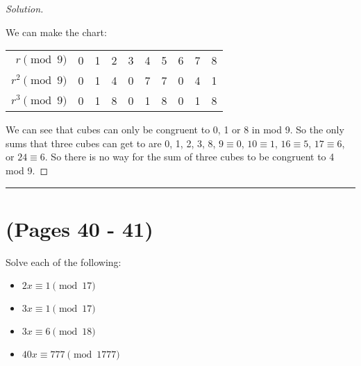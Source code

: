 \documentclass[11pt]{article}
\newcommand{\bline}{\noindent\rule[0.5ex]{\linewidth}{1pt}}
\newenvironment{problem}[2][Problem]{\begin{trivlist}
\item[\hskip \labelsep {\bfseries #1}\hskip \labelsep {\bfseries #2.}]}{\end{trivlist}}
\newenvironment{solution}
  {\renewcommand\qedsymbol{$~$}\begin{proof}[Solution]$ $\par\nobreak\ignorespaces}
  {\end{proof}}
\begin{document}
\begin{solution}
  We can make the chart:

  \setlength{\tabcolsep}{3pt}
  \begin{center}
    \begin{tabular}{r||c|c|c|c|c|c|c|c|c}
      $r    \pmod{9}$    & 0 & 1 & 2 & 3 & 4 & 5 & 6 & 7 & 8 \\
      $r^2     \pmod{9}$ & 0 & 1 & 4 & 0 & 7 & 7 & 0 & 4 & 1 \\
      $r^3     \pmod{9}$ & 0 & 1 & 8 & 0 & 1 & 8 & 0 & 1 & 8 \\
    \end{tabular}
  \end{center}

  We can see that cubes can only be congruent to 0, 1 or 8 in mod 9. So the only sums that three cubes can get to are 0, 1, 2, 3, 8, $9\equiv 0$, $10\equiv 1$, $16\equiv 5$, $17 \equiv 6$, or $24 \equiv 6$. So there is no way for the sum of three cubes to be congruent to 4 mod 9.
\end{solution}

\bline
\section{(Pages 40 - 41)}

\begin{problem}{1}
Solve each of the following:
\begin{itemize}
  \item [(a)] $2x\equiv 1 \pmod{17}$
  \item [(b)] $3x\equiv 1 \pmod{17}$
  \item [(c)] $3x\equiv 6 \pmod{18}$
  \item [(d)] $40x\equiv 777 \pmod{1777}$
\end{itemize}

\end{problem}
\end{document}
